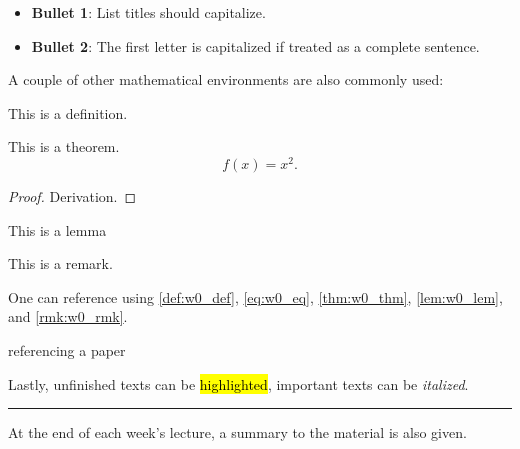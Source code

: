 \begin{itemize}
    \item \textbf{Bullet 1}: List titles should capitalize.
    \item \textbf{Bullet 2}: The first letter is capitalized if treated as a complete sentence.
\end{itemize}

A couple of other mathematical environments are also commonly used:

\begin{definition} \label{def:w0_def}
This is a definition.
\end{definition} 

\begin{theorem} \label{thm:w0_thm}
This is a theorem.
\begin{equation}
    f(x) = x^2. \label{eq:w0_eq}
\end{equation}
\end{theorem}
\begin{proof}
    Derivation.
\end{proof}

\begin{lemma} \label{lem:w0_lem}
This is a lemma
\end{lemma}

\begin{remark} \label{rmk:w0_rmk}
This is a remark.
\end{remark}

One can reference using \autoref{def:w0_def}, \autoref{eq:w0_eq}, \autoref{thm:w0_thm}, \autoref{lem:w0_lem}, and \autoref{rmk:w0_rmk}.

\begin{paper}
    referencing a paper
\end{paper}

Lastly, unfinished texts can be \hl{highlighted}, important texts can be \textit{italized}.

\vspace{1cm}
\hrule
\begin{summary}{0}
    At the end of each week's lecture, a summary to the material is also given.
\end{summary}
